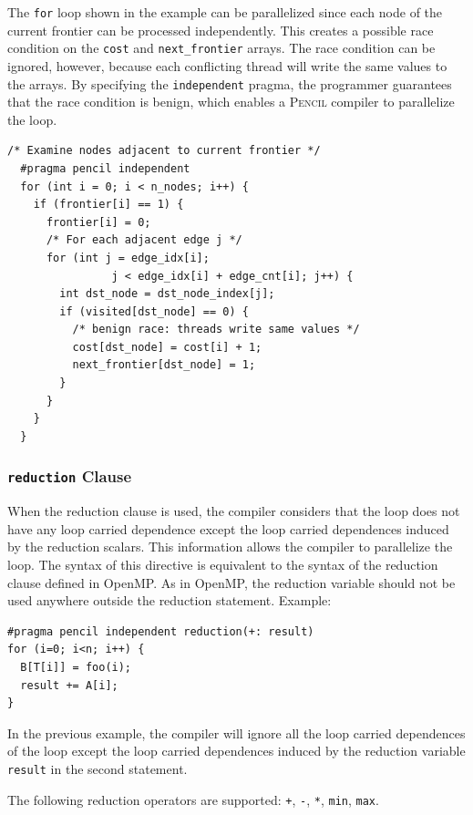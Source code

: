 \documentclass{carp}
\newcommand\pencil{\textsc{Pencil}\xspace}
\begin{document}
\begin{description}
  The \lstinline|for| loop shown in the example can be
  parallelized since each node of the current frontier can be processed
  independently.
  This creates a possible race condition on the \lstinline|cost| and
  \lstinline|next_frontier| arrays.
  The race condition can be ignored, however, because each conflicting thread
  will write the same values to the arrays.
  By specifying the \lstinline|independent| pragma, the programmer guarantees
  that the race condition is benign, which enables a \pencil compiler to
  parallelize the loop.

  \begin{lstlisting}[language=pencil]
  /* Examine nodes adjacent to current frontier */
  #pragma pencil independent
  for (int i = 0; i < n_nodes; i++) {
    if (frontier[i] == 1) {
      frontier[i] = 0;
      /* For each adjacent edge j */
      for (int j = edge_idx[i];
                j < edge_idx[i] + edge_cnt[i]; j++) {
        int dst_node = dst_node_index[j];
        if (visited[dst_node] == 0) {
          /* benign race: threads write same values */
          cost[dst_node] = cost[i] + 1;
          next_frontier[dst_node] = 1;
        }
      }
    }
  }
  \end{lstlisting}
  
  \subsubsection{\lstinline!reduction! Clause}
  \label{reduction-clause}

  When the reduction clause is used, the compiler
  considers that the loop does not have any loop carried dependence except
  the loop carried dependences induced by the reduction scalars.  This
  information allows the compiler to parallelize the loop.  The syntax
  of this directive is equivalent to the syntax of the reduction clause
  defined in OpenMP.  As in OpenMP, the reduction variable should not
  be used anywhere outside the reduction statement.  Example:
  \begin{lstlisting}[language=pencil]
#pragma pencil independent reduction(+: result)
for (i=0; i<n; i++) {
  B[T[i]] = foo(i);
  result += A[i];
}
  \end{lstlisting}
  In the previous example, the compiler will ignore all the loop carried
  dependences of the loop except the loop carried dependences induced by
  the reduction variable \lstinline!result! in the second statement.

The following reduction operators are supported:
\lstinline!+!, \lstinline!-!, \lstinline!*!, \lstinline!min!, \lstinline!max!.


\end{description}
\end{document}
